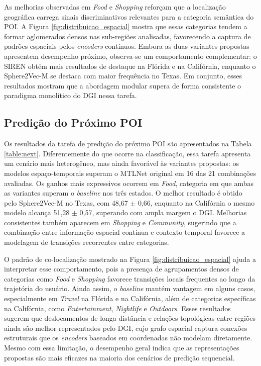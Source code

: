As melhorias observadas em \textit{Food} e \textit{Shopping} reforçam que a localização geográfica carrega sinais discriminativos relevantes para a categoria semântica do POI. A Figura \ref{fig:distribuicao_espacial} mostra que essas categorias tendem a formar aglomerados densos nas sub-regiões analisadas, favorecendo a captura de padrões espaciais pelos \textit{encoders} contínuos. Embora as duas variantes propostas apresentem desempenho próximo, observa-se um comportamento complementar: o SIREN obtém mais resultados de destaque na Flórida e na Califórnia, enquanto o Sphere2Vec-M se destaca com maior frequência no Texas. Em conjunto, esses resultados mostram que a abordagem modular supera de forma consistente o paradigma monolítico do DGI nessa tarefa.



\subsection{Predição do Próximo POI}

Os resultados da tarefa de predição do próximo POI são apresentados na Tabela \ref{table:next}. Diferentemente do que ocorre na classificação, essa tarefa apresenta um cenário mais heterogêneo, mas ainda favorável às variantes propostas: os modelos espaço-temporais superam o MTLNet original em 16 das 21 combinações avaliadas. Os ganhos mais expressivos ocorrem em \textit{Food}, categoria em que ambas as variantes superam o \textit{baseline} nos três estados. O melhor resultado é obtido pelo Sphere2Vec-M no Texas, com 48,67 $\pm$ 0,66, enquanto na Califórnia o mesmo modelo alcança 51,28 $\pm$ 0,57, superando com ampla margem o DGI. Melhorias consistentes também aparecem em \textit{Shopping} e \textit{Community}, sugerindo que a combinação entre informação espacial contínua e contexto temporal favorece a modelagem de transições recorrentes entre categorias.

O padrão de co-localização mostrado na Figura \ref{fig:distribuicao_espacial} ajuda a interpretar esse comportamento, pois a presença de agrupamentos densos de categorias como \textit{Food} e \textit{Shopping} favorece transições locais frequentes ao longo da trajetória do usuário. Ainda assim, o \textit{baseline} mantém vantagem em alguns casos, especialmente em \textit{Travel} na Flórida e na Califórnia, além de categorias específicas na Califórnia, como \textit{Entertainment}, \textit{Nightlife} e \textit{Outdoors}. Esses resultados sugerem que deslocamentos de longa distância e relações topológicas entre regiões ainda são melhor representados pelo DGI, cujo grafo espacial captura conexões estruturais que os \textit{encoders} baseados em coordenadas não modelam diretamente. Mesmo com essa limitação, o desempenho geral indica que as representações propostas são mais eficazes na maioria dos cenários de predição sequencial.
